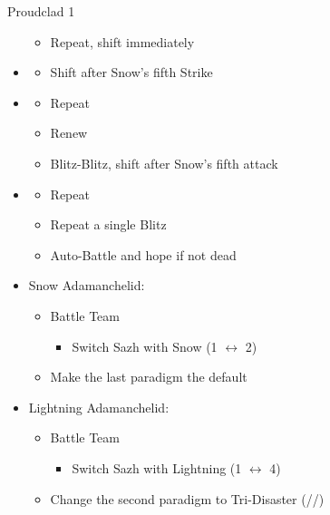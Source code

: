 \begin{battle}[1:31]{Proudclad 1}
\begin{itemize}
		      \begin{itemize}
			      \item Repeat, shift immediately
		      \end{itemize}
		\item \sixth
		      \begin{itemize}
			      \item Shift after Snow's fifth Strike
		      \end{itemize}
		\item \first
		      \begin{itemize}
			      \item Repeat
			      \item Renew
			      \item Blitz-Blitz, shift after Snow's fifth attack
		      \end{itemize}
		\item \second
		      \begin{itemize}
			      \item Repeat
			      \item Repeat a single Blitz
			      \item Auto-Battle and hope if not dead
		      \end{itemize}
	\end{itemize}
\end{battle}

\begin{menu}
	\begin{itemize}
		\item Snow Adamanchelid:
		      \begin{itemize}
			      \paradigm
			      \begin{itemize}
				      \item Battle Team
				            \begin{itemize}
					            \item Switch Sazh with Snow (1 $\leftrightarrow$ 2)
				            \end{itemize}
				      \item Make the last paradigm the default
			      \end{itemize}
		      \end{itemize}
		\item Lightning Adamanchelid:
		      \begin{itemize}
			      \paradigm
			      \begin{itemize}
				      \item Battle Team
				            \begin{itemize}
					            \item Switch Sazh with Lightning (1 $\leftrightarrow$ 4)
				            \end{itemize}
				      \item Change the second paradigm to Tri-Disaster (\rav/\rav/\rav)
			      \end{itemize}
		      \end{itemize}
	\end{itemize}
\end{menu}


